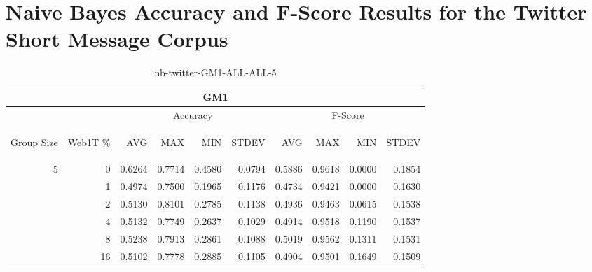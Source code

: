 \chapter{Naive Bayes Accuracy and F-Score Results for the Twitter Short Message Corpus}

\begin{center}
\begin{table}[htbp]
\begin{tabular}{ | r | r | r | r | r | r | r | r | r | r |}
\hline
\multicolumn{10}{|c|}{GM1}\\
\hline
 & & \multicolumn{4}{|c|}{Accuracy} & \multicolumn{4}{|c|}{F-Score}\\ \cline{3-10}
\begin{sideways}Group Size\end{sideways} & \begin{sideways}Web1T \%\end{sideways} & \begin{sideways}AVG\end{sideways} & \begin{sideways}MAX\end{sideways} & \begin{sideways}MIN\end{sideways} & \begin{sideways}STDEV\end{sideways} & \begin{sideways}AVG\end{sideways} & \begin{sideways}MAX\end{sideways} & \begin{sideways}MIN\end{sideways} & \begin{sideways}STDEV\end{sideways}\\
\hline
\multirow{5}{*}{5}
 & 0 & 0.6264 & 0.7714 & 0.4580 & 0.0794 & 0.5886 & 0.9618 & 0.0000 & 0.1854\\ \cline{2-10}
 & 1 & 0.4974 & 0.7500 & 0.1965 & 0.1176 & 0.4734 & 0.9421 & 0.0000 & 0.1630\\ \cline{2-10}
 & 2 & 0.5130 & 0.8101 & 0.2785 & 0.1138 & 0.4936 & 0.9463 & 0.0615 & 0.1538\\ \cline{2-10}
 & 4 & 0.5132 & 0.7749 & 0.2637 & 0.1029 & 0.4914 & 0.9518 & 0.1190 & 0.1537\\ \cline{2-10}
 & 8 & 0.5238 & 0.7913 & 0.2861 & 0.1088 & 0.5019 & 0.9562 & 0.1311 & 0.1531\\ \cline{2-10}
 & 16 & 0.5102 & 0.7778 & 0.2885 & 0.1105 & 0.4904 & 0.9501 & 0.1649 & 0.1509\\ \cline{2-10}
\hline
\end{tabular}
\caption{nb-twitter-GM1-ALL-ALL-5}
\label{table:nb-twitter-GM1-ALL-ALL-5}
\end{table}
\end{center}

